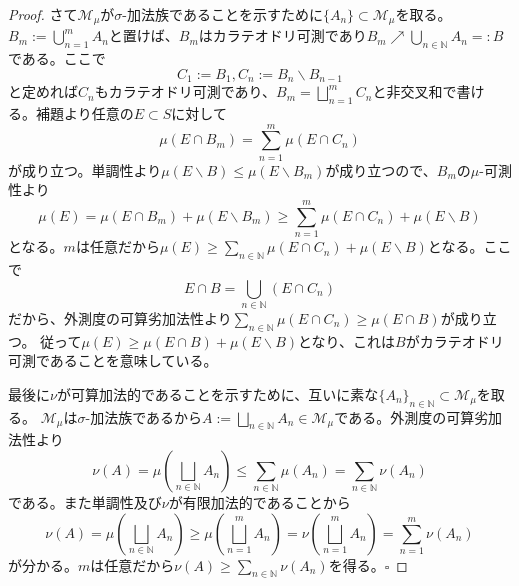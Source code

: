 \documentclass[../root.tex]{subfiles}
\begin{document}
\begin{proof}
さて$ \mathscr{M}_{\mu} $が$ \sigma $-加法族であることを示すために$ \lbrace A_{n} \rbrace\subset\mathscr{M}_{\mu} $を取る。
$ B_{m}:=\bigcup_{n=1}^{m}A_{n} $と置けば、$ B_{m} $はカラテオドリ可測であり$ B_{m}\nearrow\bigcup_{n\in\mathbb{N}}A_{n}=\colon B $である。ここで
\[ C_{1}:=B_{1}, C_{n}:=B_{n}\backslash B_{n-1} \]
と定めれば$ C_{n} $もカラテオドリ可測であり、$ B_{m}=\bigsqcup_{n=1}^{m}C_{n} $と非交叉和で書ける。補題より任意の$ E\subset S $に対して
\[ \mu( E\cap B_{m} )=\sum_{n=1}^{m}\mu( E\cap C_{n} ) \]
が成り立つ。単調性より$ \mu( E\backslash B )\le\mu( E\backslash B_{m} ) $が成り立つので、$ B_{m} $の$ \mu $-可測性より
\[ \mu( E )=\mu( E\cap B_{m} )+\mu( E\backslash B_{m} )\ge\sum_{n=1}^{m}\mu( E\cap C_{n} )+\mu( E\backslash B ) \]
となる。$ m $は任意だから$ \mu( E )\ge\sum_{n\in\mathbb{N}}\mu( E\cap C_{n} )+\mu( E\backslash B ) $となる。ここで
\[ E\cap B=\bigcup_{n\in\mathbb{N}}( E\cap C_{n} ) \]
だから、外測度の可算劣加法性より$ \sum_{n\in\mathbb{N}}\mu( E\cap C_{n} )\ge\mu( E\cap B ) $が成り立つ。
従って$ \mu( E )\ge\mu( E\cap B )+\mu( E\backslash B ) $となり、これは$ B $がカラテオドリ可測であることを意味している。

最後に$ \nu $が可算加法的であることを示すために、互いに素な$ \lbrace A_{n} \rbrace_{n\in\mathbb{N}}\subset\mathscr{M}_{\mu} $を取る。
$ \mathscr{M}_{\mu} $は$ \sigma $-加法族であるから$ A:=\bigsqcup_{n\in\mathbb{N}}A_{n}\in\mathscr{M}_{\mu} $である。外測度の可算劣加法性より
\[ \nu(A)=\mu\left( \bigsqcup_{n\in\mathbb{N}}A_{n} \right)\le\sum_{n\in\mathbb{N}}\mu( A_{n} )=\sum_{n\in\mathbb{N}}\nu( A_{n} ) \]
である。また単調性及び$ \nu $が有限加法的であることから
\[ \nu( A )=\mu\left( \bigsqcup_{n\in\mathbb{N}}A_{n} \right)\ge\mu\left( \bigsqcup_{n=1}^{m}A_{n} \right)=\nu\left( \bigsqcup_{n=1}^{m}A_{n} \right)=\sum_{n=1}^{m}\nu( A_{n} ) \]
が分かる。$ m $は任意だから$ \nu( A )\ge\sum_{n\in\mathbb{N}}\nu( A_{n} ) $を得る。$ \square $
\end{proof}
\end{document}
